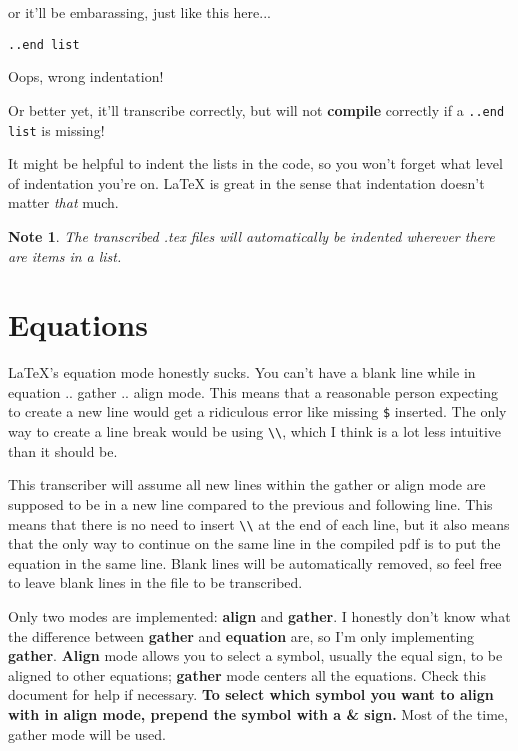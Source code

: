 \documentclass[12pt]{article}
\newtheorem{Note}[Lemma]{Note}
\begin{document}
\begin{flushleft}
\begin{itemize}
    or it'll be embarassing, just like this here...
    
\end{itemize}
\verb|..end list|

Oops, wrong indentation!

Or better yet, it'll transcribe correctly,
but will not \textbf{compile} correctly if a \verb|..end list| is missing!

It might be helpful to indent the lists in the code, so you won't forget what level of indentation you're on. LaTeX is great in the sense that indentation doesn't matter \emph{that} much.

\begin{Note}
The transcribed .tex files will automatically be indented wherever there are items in a list.
\end{Note}

\section{Equations}

LaTeX's equation mode honestly sucks. You can't have a blank line while in equation .. gather .. align mode. This means that a reasonable person expecting to create a new line would get a ridiculous error like missing \verb|$| inserted. The only way to create a line break would be using \verb|\\|, which I think is a lot less intuitive than it should be.

\medskip

This transcriber will assume all new lines within the gather or align mode are supposed to be in a new line compared to the previous and following line. This means that there is no need to insert \verb|\\| at the end of each line, but it also means that the only way to continue on the same line in the compiled pdf is to put the equation in the same line. Blank lines will be automatically removed, so feel free to leave blank lines in the file to be transcribed.

\medskip

Only two modes are implemented: \textbf{align} and \textbf{gather}. I honestly don't know what the difference between \textbf{gather} and \textbf{equation} are, so I'm only implementing \textbf{gather}. \textbf{Align} mode allows you to select a symbol, usually the equal sign, to be aligned to other equations; \textbf{gather} mode centers all the equations. Check this document for help if necessary. \textbf{To select which symbol you want to align with in align mode, prepend the symbol with a \& sign.} Most of the time, gather mode will be used.


\end{flushleft}
\end{document}
